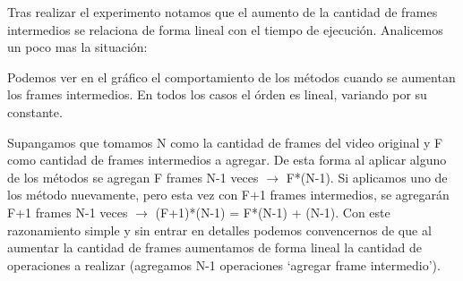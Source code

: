 \begin{figure}[ht]
	\begin{center}
	\end{center}
\end{figure}
\par Tras realizar el experimento notamos que el aumento de la cantidad de frames intermedios se relaciona de forma lineal con el tiempo de ejecuci\'on. Analicemos un poco mas la situaci\'on:

\par Podemos ver en el gr\'afico el comportamiento de los m\'etodos cuando se aumentan los frames intermedios. En todos los casos el \'orden es lineal, variando por su constante.

\par Supangamos que tomamos N como la cantidad de frames del video original y F como cantidad de frames intermedios a agregar. De esta forma al aplicar alguno de los m\'etodos se agregan F frames N-1 veces $\longrightarrow$ F*(N-1). Si aplicamos uno de los m\'etodo nuevamente, pero esta vez con F+1 frames intermedios, se agregar\'an F+1 frames N-1 veces $\longrightarrow$ (F+1)*(N-1) = F*(N-1) + (N-1). Con este razonamiento simple y sin entrar en detalles podemos convencernos de que al aumentar la cantidad de frames aumentamos de forma lineal la cantidad de operaciones a realizar (agregamos N-1 operaciones `agregar frame intermedio').